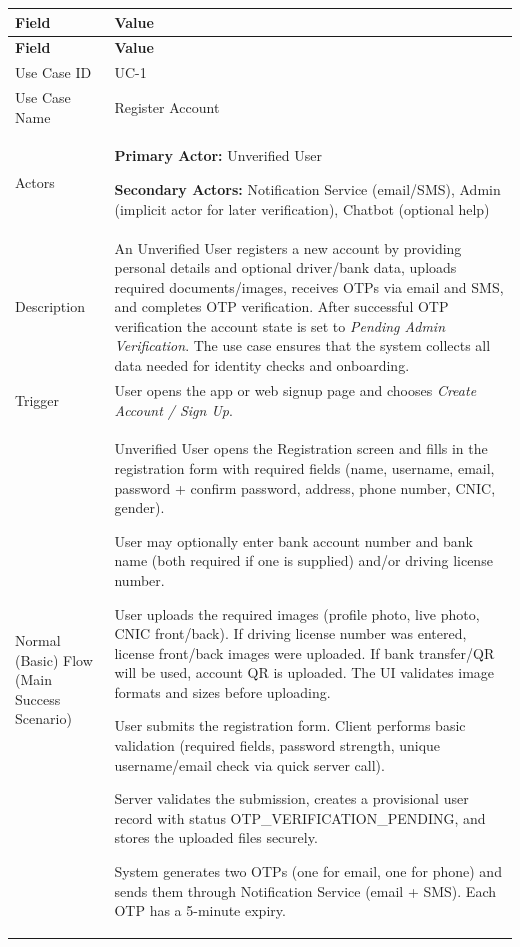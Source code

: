\begin{longtable}{|p{3.5cm}|p{12cm}|}
\hline
\rowcolor{lightgray!30}
\textbf{Field} & \textbf{Value} \\
\hline
\endfirsthead
\hline
\rowcolor{lightgray!30}
\textbf{Field} & \textbf{Value} \\
\hline
\endhead
\hline
\endfoot
Use Case ID & UC-1 \\
\hline
Use Case Name & Register Account \\
\hline
Actors & 
\textbf{Primary Actor:} Unverified User

\textbf{Secondary Actors:} Notification Service (email/SMS), Admin (implicit actor for later verification), Chatbot (optional help) \\
\hline
Description & 
An Unverified User registers a new account by providing personal details and optional driver/bank data, uploads required documents/images, receives OTPs via email and SMS, and completes OTP verification. After successful OTP verification the account state is set to \textit{Pending Admin Verification}. The use case ensures that the system collects all data needed for identity checks and onboarding. \\
\hline
Trigger & 
User opens the app or web signup page and chooses \textit{Create Account / Sign Up}. \\
\hline
Normal (Basic) Flow (Main Success Scenario) &
Unverified User opens the Registration screen and fills in the registration form with required fields (name, username, email, password + confirm password, address, phone number, CNIC, gender).

User may optionally enter bank account number and bank name (both required if one is supplied) and/or driving license number.

User uploads the required images (profile photo, live photo, CNIC front/back). If driving license number was entered, license front/back images were uploaded. If bank transfer/QR will be used, account QR is uploaded. The UI validates image formats and sizes before uploading.

User submits the registration form. Client performs basic validation (required fields, password strength, unique username/email check via quick server call).

Server validates the submission, creates a provisional user record with status OTP\_VERIFICATION\_PENDING, and stores the uploaded files securely.

System generates two OTPs (one for email, one for phone) and sends them through Notification Service (email + SMS). Each OTP has a 5-minute expiry.


\end{longtable}
